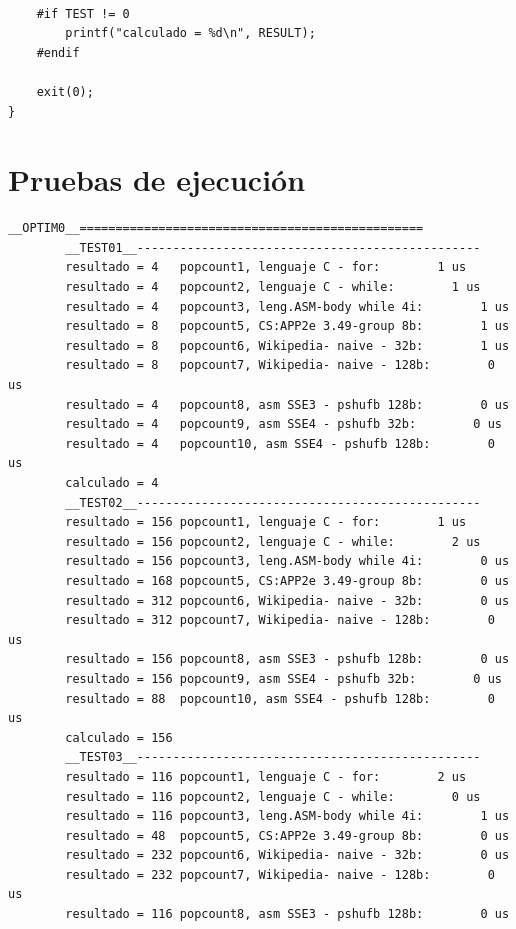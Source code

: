 \begin{lstlisting}[frame=single]
    
    #if TEST != 0     
        printf("calculado = %d\n", RESULT); 
    #endif 

    exit(0);
}
	\end{lstlisting}
	
	\section[Pruebas de ejecución]{Pruebas de ejecución}
	
	\lstset{language=[x64]Assembler}
	\begin{lstlisting}[frame=single]  
		__OPTIM0__================================================
		__TEST01__------------------------------------------------
		resultado = 4	popcount1, lenguaje C - for:        1 us
		resultado = 4	popcount2, lenguaje C - while:        1 us
		resultado = 4	popcount3, leng.ASM-body while 4i:        1 us
		resultado = 8	popcount5, CS:APP2e 3.49-group 8b:        1 us
		resultado = 8	popcount6, Wikipedia- naive - 32b:        1 us
		resultado = 8	popcount7, Wikipedia- naive - 128b:        0 us
		resultado = 4	popcount8, asm SSE3 - pshufb 128b:        0 us
		resultado = 4	popcount9, asm SSE4 - pshufb 32b:        0 us
		resultado = 4	popcount10, asm SSE4 - pshufb 128b:        0 us
		calculado = 4
		__TEST02__------------------------------------------------
		resultado = 156	popcount1, lenguaje C - for:        1 us
		resultado = 156	popcount2, lenguaje C - while:        2 us
		resultado = 156	popcount3, leng.ASM-body while 4i:        0 us
		resultado = 168	popcount5, CS:APP2e 3.49-group 8b:        0 us
		resultado = 312	popcount6, Wikipedia- naive - 32b:        0 us
		resultado = 312	popcount7, Wikipedia- naive - 128b:        0 us
		resultado = 156	popcount8, asm SSE3 - pshufb 128b:        0 us
		resultado = 156	popcount9, asm SSE4 - pshufb 32b:        0 us
		resultado = 88	popcount10, asm SSE4 - pshufb 128b:        0 us
		calculado = 156
		__TEST03__------------------------------------------------
		resultado = 116	popcount1, lenguaje C - for:        2 us
		resultado = 116	popcount2, lenguaje C - while:        0 us
		resultado = 116	popcount3, leng.ASM-body while 4i:        1 us
		resultado = 48	popcount5, CS:APP2e 3.49-group 8b:        0 us
		resultado = 232	popcount6, Wikipedia- naive - 32b:        0 us
		resultado = 232	popcount7, Wikipedia- naive - 128b:        0 us
		resultado = 116	popcount8, asm SSE3 - pshufb 128b:        0 us

\end{lstlisting}
